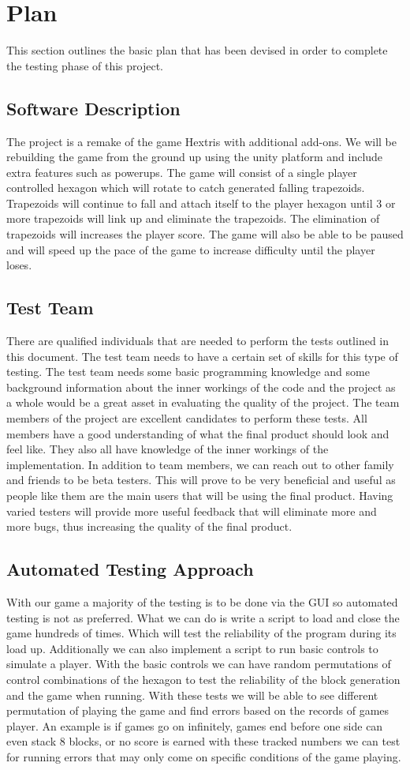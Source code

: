 \documentclass[12pt, titlepage]{article}
\begin{document}
\section{Plan}
\noindent This section outlines the basic plan that has been devised in order to complete the testing phase of this project.
\subsection{Software Description}
The project is a remake of the game Hextris with additional add-ons. We will be rebuilding the game from the ground up using the unity platform and include extra features such as powerups. The game will consist of a single player controlled hexagon which will rotate to catch generated falling trapezoids. Trapezoids will continue to fall and attach itself to the player hexagon until 3 or more trapezoids will link up and eliminate the trapezoids. The elimination of trapezoids will increases the player score. The game will also be able to be paused and will speed up the pace of the game to increase difficulty until the player loses.
\subsection{Test Team}
There are qualified individuals that are needed to perform the tests outlined in this document. The test team needs to have a certain set of skills for this type of testing. The test team needs some basic programming knowledge and some background information about the inner workings of the code and the project as a whole would be a great asset in evaluating the quality of the project. The team members of the project are excellent candidates to perform these tests. All members have a good understanding of what the final product should look and feel like. They also all have knowledge of the inner workings of the implementation. In addition to team members, we can reach out to other family and friends to be beta testers. This will prove to be very beneficial and useful as people like them are the main users that will be using the final product. Having varied testers will provide more useful feedback that will eliminate more and more bugs, thus increasing the quality of the final product.
\subsection{Automated Testing Approach}
With our game a majority of the testing is to be done via the GUI so automated testing is not as preferred. What we can do is write a script to load and close the game hundreds of times. Which will test the reliability of the program during its load up. Additionally we can also implement a script to run basic controls to simulate a player. With the basic controls we can have random permutations of control combinations of the hexagon to test the reliability of the block generation and the game when running. With these tests we will be able to see different permutation of playing the game and find errors based on the records of games player. An example is if games go on infinitely, games end before one side can even stack 8 blocks, or no score is earned with these tracked numbers we can test for running errors that may only come on specific conditions of the game playing.  
\end{document}

